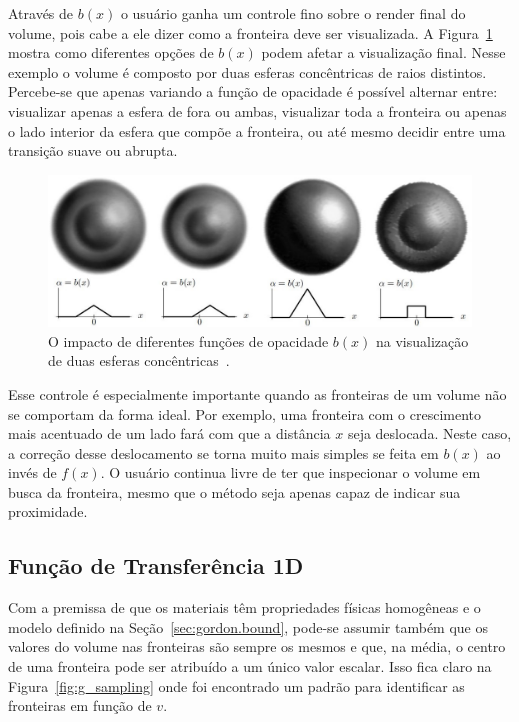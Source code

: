 	Através de $b(x)$ o usuário ganha um controle fino sobre o render final do volume, pois cabe a ele dizer como a fronteira deve ser visualizada. A Figura~\ref{fig:g_bx} mostra como diferentes opções de $b(x)$ podem afetar a visualização final. Nesse exemplo o volume é composto por duas esferas concêntricas de raios distintos. Percebe-se que apenas variando a função de opacidade é possível alternar entre: visualizar apenas a esfera de fora ou ambas, visualizar toda a fronteira ou apenas o lado interior da esfera que compõe a fronteira, ou até mesmo decidir entre uma transição suave ou abrupta.
	
\begin{figure}[h]
	\centering
	\includegraphics[width=1\textwidth]{images/g_bx}
	\caption{O impacto de diferentes funções de opacidade $b(x)$ na visualização de duas esferas concêntricas~\cite{gordon}.}
	\label{fig:g_bx}
\end{figure}

	Esse controle é especialmente importante quando as fronteiras de um volume não se comportam da forma ideal. Por exemplo, uma fronteira com o crescimento mais acentuado de um lado fará com que a distância $x$ seja deslocada. Neste caso, a correção desse deslocamento se torna muito mais simples se feita em $b(x)$ ao invés de $f(x)$. O usuário continua livre de ter que inspecionar o volume em busca da fronteira, mesmo que o método seja apenas capaz de indicar sua proximidade.
	
\subsection{Função de Transferência 1D}
\label{subsec:gordon.1d}
	Com a premissa de que os materiais têm propriedades físicas homogêneas e o modelo definido na Seção~\ref{sec:gordon.bound}, pode-se assumir também que os valores do volume nas fronteiras são sempre os mesmos e que, na média, o centro de uma fronteira pode ser atribuído a um único valor escalar. Isso fica claro na Figura~\ref{fig:g_sampling} onde foi encontrado um padrão para identificar as fronteiras em função de $v$.
	

